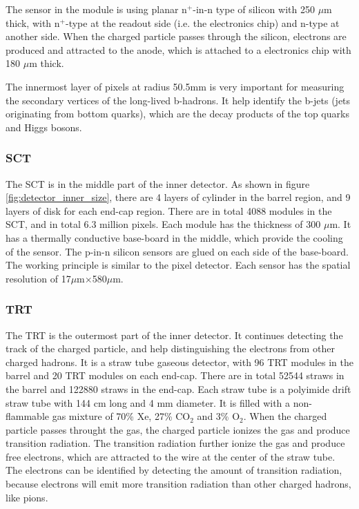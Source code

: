 The sensor in the module is using planar n$^{+}$-in-n type of silicon with 250 $\mu$m thick, with n$^{+}$-type at the readout side (i.e. the electronics chip) and n-type at another side.
When the charged particle passes through the silicon, electrons are produced and attracted to the anode, which is attached to a electronics chip with 180 $\mu$m thick.

The innermost layer of pixels at radius 50.5mm is very important for measuring the secondary vertices of the long-lived b-hadrons.
It help identify the b-jets (jets originating from bottom quarks), which are the decay products of the top quarks and Higgs bosons.

\subsubsection{SCT}
The SCT is in the middle part of the inner detector.
As shown in figure \ref{fig:detector_inner_size}, there are 4 layers of cylinder in the barrel region, and 9 layers of disk for each end-cap region.
There are in total 4088 modules in the SCT, and in total 6.3 million pixels.
Each module has the thickness of 300 $\mu$m.
It has a thermally conductive base-board in the middle, which provide the cooling of the sensor.
The p-in-n silicon sensors are glued on each side of the base-board.
The working principle is similar to the pixel detector.
Each sensor has the spatial resolution of 17$\mu$m$\times$580$\mu$m.

\subsubsection{TRT}
The TRT is the outermost part of the inner detector.
It continues detecting the track of the charged particle, and help distinguishing the electrons from other charged hadrons.
It is a straw tube gaseous detector, with 96 TRT modules in the barrel and 20 TRT modules on each end-cap.
There are in total 52544 straws in the barrel and 122880 straws in the end-cap.
Each straw tube is a polyimide drift straw tube with 144 cm long and 4 mm diameter.
It is filled with a non-flammable gas mixture of 70\% Xe, 27\% CO$_2$ and 3\% O$_2$.
When the charged particle passes throught the gas, the charged particle ionizes the gas and produce transition radiation.
The transition radiation further ionize the gas and produce free electrons, which are attracted to the wire at the center of the straw tube.
The electrons can be identified by detecting the amount of transition radiation, because electrons will emit more transition radiation than other charged hadrons, like pions.

